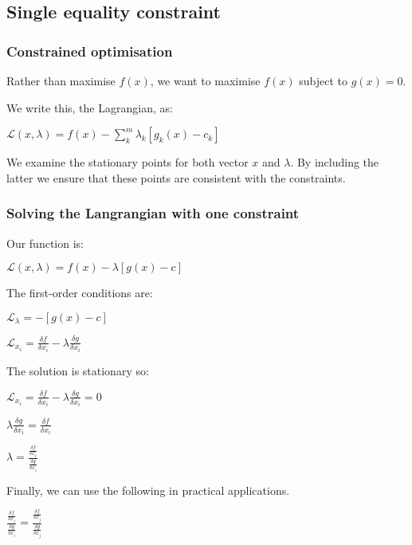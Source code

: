 
\subsection{Single equality constraint}

\subsubsection{Constrained optimisation}

Rather than maximise \(f(x)\), we want to maximise \(f(x)\) subject to \(g(x)=0\).

We write this, the Lagrangian, as:

$\mathcal{L}(x,\lambda )=f(x)-\sum^m_k\lambda_k [g_k(x)-c_k]$

We examine the stationary points for both vector \(x\) and \(\lambda \). By including the latter we ensure that these points are consistent with the constraints.

\subsubsection{Solving the Langrangian with one constraint}

Our function is:

$\mathcal{L}(x, \lambda )=f(x)-\lambda [g(x)-c]$

The first-order conditions are:

$\mathcal{L}_{\lambda }= -[g(x)-c]$

$\mathcal{L}_{x_i}=\frac{\delta f}{\delta x_i}-\lambda \frac{\delta g}{\delta x_i}$

The solution is stationary so:

$\mathcal{L}_{x_i}=\frac{\delta f}{\delta x_i}-\lambda \frac{\delta g}{\delta x_i}=0$

$\lambda \frac{\delta g}{\delta x_i}=\frac{\delta f}{\delta x_i}$

$\lambda =\frac{\frac{\delta f}{\delta x_i}}{\frac{\delta g}{\delta x_i}}$

Finally, we can use the following in practical applications.

$\frac{\frac{\delta f}{\delta x_i}}{\frac{\delta g}{\delta x_i}}=\frac{\frac{\delta f}{\delta x_j}}{\frac{\delta g}{\delta x_j}}$


